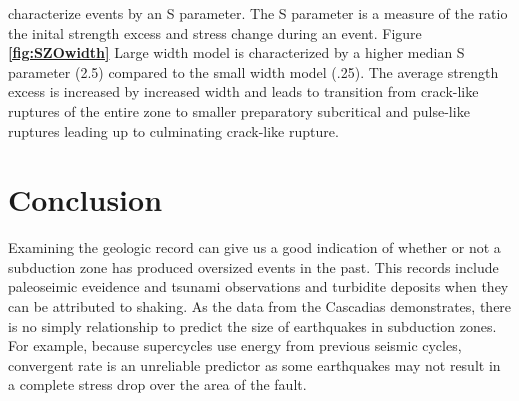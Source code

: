 \documentclass[draft,jgrga]{agutex}
\begin{document}
\citet{Herrendorfer2015} characterize events by an S parameter. The S parameter is a measure of the ratio the inital strength excess and stress change during an event. Figure {\bf \ref{fig:SZOwidth}} Large width model is characterized by a higher median S parameter (2.5) compared to the small width model (.25). The average strength excess is increased by increased width and leads to transition from crack-like ruptures of the entire zone to smaller preparatory subcritical and pulse-like ruptures leading up to culminating crack-like rupture. 


\section{Conclusion}
Examining the geologic record can give us a good indication of whether or not a subduction zone has produced oversized events in the past. This records include paleoseimic eveidence and tsunami observations and turbidite deposits when they can be attributed to shaking. As the data from the Cascadias demonstrates, there is no simply relationship to predict the size of earthquakes in subduction zones. For example, because supercycles use energy from previous seismic cycles, convergent rate is an unreliable predictor as some earthquakes may not result in a complete stress drop over the area of the fault. 











\end{document}

